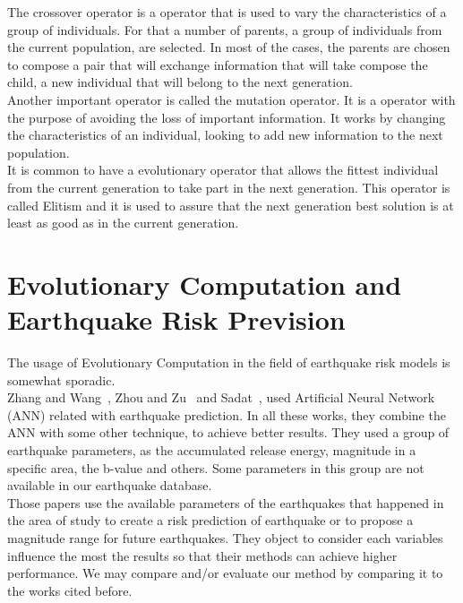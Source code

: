 The crossover operator is a operator that is used to vary the characteristics of a group of individuals. For that a number of parents, a group of individuals from the current population, are selected. In most of the cases, the parents are chosen to compose a pair that will exchange information that will take compose the child, a new individual that will belong to the next generation.\\

Another important operator is called the mutation operator. It is a operator with the purpose of avoiding the loss of important information. It works by changing the characteristics of an individual, looking to add new information to the next population.\\

It is common to have a evolutionary operator that allows the fittest individual from the current generation to take part in the next generation. This operator is called Elitism and it is used to assure that the next generation best solution is at least as good as in the current generation.\\

\section{Evolutionary Computation and Earthquake Risk Prevision}
The usage of Evolutionary Computation in the field of earthquake risk models is somewhat sporadic.\\

Zhang and Wang~\cite{Zhang2012}, Zhou and Zu~\cite{Feiyan2014} and Sadat~\cite{sadat2015application}, used Artificial Neural Network (ANN) related with earthquake prediction. In all these works, they combine the ANN with some other technique, to achieve better results. They used a group of earthquake parameters, as the accumulated release energy, magnitude in a specific area, the b-value and others. Some parameters in this group are not available in our earthquake database.\\

Those papers use the available parameters of the earthquakes that happened in the area of study to create a risk prediction of earthquake or to propose a magnitude range for future earthquakes. They object to consider each variables influence the most the results so that their methods can achieve higher performance. We may compare and/or evaluate our method by comparing it to the works cited before.\\

